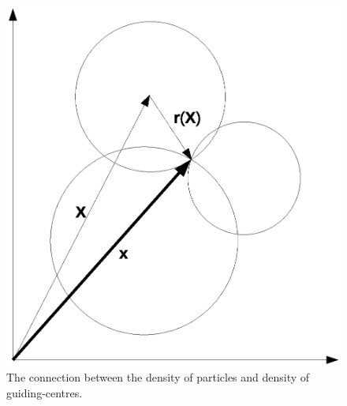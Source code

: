\documentclass[a4paper,10pt]{article}
\begin{document}
\begin{figure}
 \begin{center}
	\includegraphics[scale=0.3]{density-gc.eps}
 \end{center}
 \caption{The connection between the density of particles and density of guiding-centres.}
 \label{fig:density-gc}
\end{figure}
\end{document}
